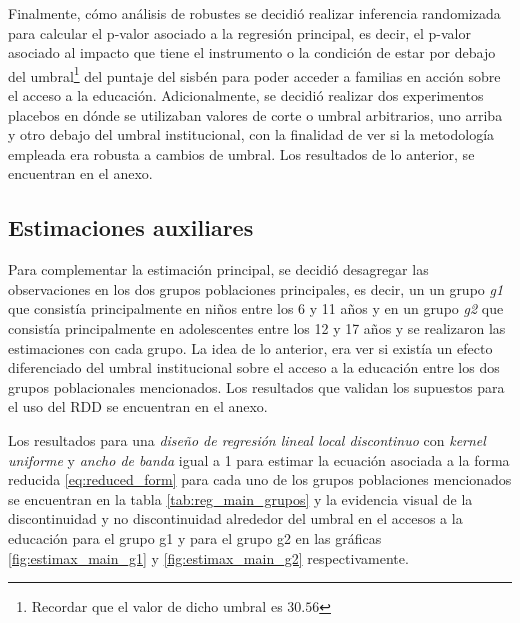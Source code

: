 \documentclass[AER]{AEA}
\begin{document}
Finalmente, cómo análisis de robustes se decidió realizar inferencia randomizada para calcular el p-valor asociado a la regresión principal, es decir, el p-valor asociado al impacto que tiene el instrumento o la condición de estar por debajo del umbral\footnote{Recordar que el valor de dicho umbral es $30.56$} del puntaje del sisbén para poder acceder a familias en acción sobre el acceso a la educación. Adicionalmente, se decidió realizar dos experimentos placebos en dónde se utilizaban valores de corte o umbral arbitrarios, uno arriba y otro debajo del umbral institucional, con la finalidad de ver si la metodología empleada era robusta a cambios de umbral. Los resultados de lo anterior, se encuentran en el anexo. 

\subsection{Estimaciones auxiliares}

Para complementar la estimación principal, se decidió desagregar las observaciones en los dos grupos poblaciones principales, es decir, un un grupo \textit{g1} que consistía principalmente en niños entre los 6 y 11 años y en un grupo \textit{g2} que consistía principalmente en adolescentes entre los 12 y 17 años y se realizaron las estimaciones con cada grupo. La idea de lo anterior, era ver si existía un efecto diferenciado del umbral institucional sobre el acceso a la educación entre los dos grupos poblacionales mencionados. Los resultados que validan los supuestos para el uso del RDD se encuentran en el anexo. 

Los resultados para una \textit{diseño de regresión lineal local discontinuo} con \textit{kernel uniforme} y \textit{ancho de banda} igual a 1 para estimar la ecuación asociada a la forma reducida \ref{eq:reduced_form} para cada uno de los grupos poblaciones mencionados se encuentran en la tabla \ref{tab:reg_main_grupos} y la evidencia visual de la discontinuidad y no discontinuidad alrededor del umbral en el accesos a la educación para el grupo g1 y para el grupo g2 en las gráficas \ref{fig:estimax_main_g1} y \ref{fig:estimax_main_g2} respectivamente.
\end{document}
